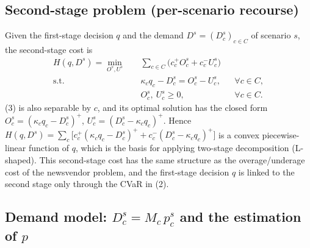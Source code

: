 \documentclass[10pt,a4paper]{article}
\begin{document}
\subsection{Second-stage problem (per-scenario recourse)}

Given the first-stage decision $q$ and the demand $D^s=(D_c^s)_{c\in C}$ of scenario $s$, the second-stage cost is
\begin{subequations}\label{eq:second}
\begin{align}
H(q,D^s)=\min_{O^s,U^s}\quad
 & \sum_{c\in C}\big(c_c^+O_c^s+c_c^-U_c^s\big) \label{eq:3a}\\
\text{s.t.}\quad
 & \kappa_c q_c-D_c^s=O_c^s-U_c^s, && \forall c\in C, \label{eq:3b}\\
 & O_c^s,\ U_c^s\ge 0, && \forall c\in C. \label{eq:3c}
\end{align}
\end{subequations}
(3) is also separable by $c$, and its optimal solution has the closed form $O_c^s=(\kappa_c q_c-D_c^s)^+$, $U_c^s=(D_c^s-\kappa_c q_c)^+$. Hence $H(q,D^s)=\sum_c\big[c_c^+(\kappa_c q_c-D_c^s)^+ + c_c^-(D_c^s-\kappa_c q_c)^+\big]$ is a convex piecewise-linear function of $q$, which is the basis for applying two-stage decomposition (L-shaped).
This second-stage cost has the same structure as the overage/underage cost of the newsvendor problem, and the first-stage decision $q$ is linked to the second stage only through the CVaR in (2).

\subsection{Demand model: $D_c^s=M_c\,p_c^s$ and the estimation of $p$}\label{sec:demand}
\end{document}
